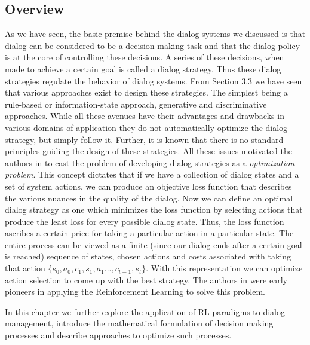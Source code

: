 \documentclass[14pt]{extarticle}
\numberwithin{equation}{section}
\begin{document}
	\subsection{Overview}
	As we have seen, the basic premise behind the dialog systems we discussed is that dialog can be considered to be a decision-making task and that the dialog policy is at the core of controlling these decisions. A series of these decisions, when made to achieve a certain goal is called a dialog strategy. Thus these dialog strategies regulate the behavior of dialog systems. From Section 3.3 we have seen that various approaches exist to design these strategies. The simplest being a rule-based or information-state approach, generative and discriminative approaches.  While all these avenues have their advantages and drawbacks in various domains of application they do not automatically optimize the dialog strategy, but simply follow it. Further, it is known that there is no standard principles guiding the design of these strategies. All these issues motivated the authors in \cite{Levin97astochastic} to cast the problem of developing dialog strategies as a \textit{optimization problem}. This concept dictates that if we have a collection of dialog states and a set of system actions, we can produce an objective loss function that describes the various nuances in the quality of the dialog. Now we can define an optimal dialog strategy as one which minimizes the loss function by selecting actions that produce the least loss for every possible dialog state. Thus, the loss function ascribes a certain price for taking a particular action in a particular state. The entire process can be viewed as a finite (since our dialog ends after a certain goal is reached) sequence of states, chosen actions and costs associated with taking that action $\{s_0,a_0,c_1,s_1,a_1...,c_{t-1},s_t\}$. With this representation we can optimize action selection to come up with the best strategy. The authors in \cite{Levin97astochastic}\cite{mdp-pieraccini} were early pioneers in applying the Reinforcement Learning to solve this problem. \par
	In this chapter we further explore the application of RL paradigms to dialog management, introduce the mathematical formulation of decision making processes and describe approaches to optimize such processes.
\end{document}
